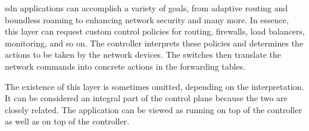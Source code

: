 \gls{sdn} applications can accomplish a variety of goals, from adaptive routing and boundless roaming to enhancing network security and many more\cite{xia_survey_2015}. In essence, this layer can request custom control policies for routing, firewalls, load balancers, monitoring, and so on. The controller interprets these policies and determines the actions to be taken by the network devices. The switches then translate the network commands into concrete actions in the forwarding tables\cite{kreutz_software-defined_2015}. 

The existence of this layer is sometimes omitted, depending on the interpretation. It can be considered an integral part of the control plane because the two are closely related. The application can be viewed as running on top of the controller as well as on top of the controller\cite{peterson_software-defined_2021}.

